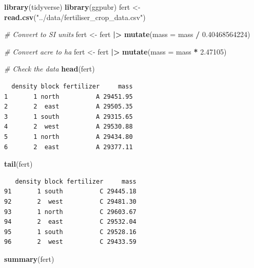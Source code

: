 \documentclass[
  10t,
]{article}
\newenvironment{Shaded}{\begin{snugshade}}{\end{snugshade}}
\newcommand{\AttributeTok}[1]{\textcolor[rgb]{0.13,0.29,0.53}{#1}}
\newcommand{\CommentTok}[1]{\textcolor[rgb]{0.56,0.35,0.01}{\textit{#1}}}
\newcommand{\FloatTok}[1]{\textcolor[rgb]{0.00,0.00,0.81}{#1}}
\newcommand{\FunctionTok}[1]{\textcolor[rgb]{0.13,0.29,0.53}{\textbf{#1}}}
\newcommand{\NormalTok}[1]{#1}
\newcommand{\OtherTok}[1]{\textcolor[rgb]{0.56,0.35,0.01}{#1}}
\newcommand{\SpecialCharTok}[1]{\textcolor[rgb]{0.81,0.36,0.00}{\textbf{#1}}}
\newcommand{\StringTok}[1]{\textcolor[rgb]{0.31,0.60,0.02}{#1}}
\begin{document}
\begin{Shaded}
\begin{Highlighting}[]
\FunctionTok{library}\NormalTok{(tidyverse)}
\FunctionTok{library}\NormalTok{(ggpubr)}
\NormalTok{fert }\OtherTok{\textless{}{-}} \FunctionTok{read.csv}\NormalTok{(}\StringTok{"../data/fertiliser\_crop\_data.csv"}\NormalTok{)}

\CommentTok{\# Convert to SI units}
\NormalTok{fert }\OtherTok{\textless{}{-}}\NormalTok{ fert }\SpecialCharTok{|\textgreater{}}
  \FunctionTok{mutate}\NormalTok{(}\AttributeTok{mass =}\NormalTok{ mass }\SpecialCharTok{/} \FloatTok{0.40468564224}\NormalTok{)}

\CommentTok{\# Convert acre to ha}
\NormalTok{fert }\OtherTok{\textless{}{-}}\NormalTok{ fert }\SpecialCharTok{|\textgreater{}}
  \FunctionTok{mutate}\NormalTok{(}\AttributeTok{mass =}\NormalTok{ mass }\SpecialCharTok{*} \FloatTok{2.47105}\NormalTok{)}

\CommentTok{\# Check the data}
\FunctionTok{head}\NormalTok{(fert)}
\end{Highlighting}
\end{Shaded}

\begin{verbatim}
  density block fertilizer     mass
1       1 north          A 29451.95
2       2  east          A 29505.35
3       1 south          A 29315.65
4       2  west          A 29530.88
5       1 north          A 29434.80
6       2  east          A 29377.11
\end{verbatim}

\begin{Shaded}
\begin{Highlighting}[]
\FunctionTok{tail}\NormalTok{(fert)}
\end{Highlighting}
\end{Shaded}

\begin{verbatim}
   density block fertilizer     mass
91       1 south          C 29445.18
92       2  west          C 29481.30
93       1 north          C 29603.67
94       2  east          C 29532.04
95       1 south          C 29528.16
96       2  west          C 29433.59
\end{verbatim}

\begin{Shaded}
\begin{Highlighting}[]
\FunctionTok{summary}\NormalTok{(fert)}
\end{Highlighting}
\end{Shaded}
\end{document}
